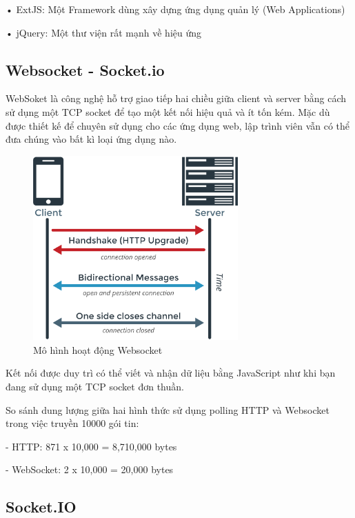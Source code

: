 • ExtJS: Một Framework dùng xây dựng ứng dụng quản lý (Web Applications)

• jQuery: Một thư viện rất mạnh về hiệu ứng

\subsection{Websocket - Socket.io}
WebSoket là công nghệ hỗ trợ giao tiếp hai chiều giữa client và server bằng cách sử dụng một TCP socket để tạo một kết nối hiệu quả và ít tốn kém. Mặc dù được thiết kế để chuyên sử dụng cho các ứng dụng web, lập trình viên vẫn có thể đưa chúng vào bất kì loại ứng dụng nào.\cite{c2wk}
\begin{figure}[H]
	\centering    
	\includegraphics[width=0.7\textwidth]{websk}
	\caption[Mô hình hoạt động Websocket]{Mô hình hoạt động Websocket\cite{c2wk2}} 
	\label{fig: websk}
\end{figure}

Kết nối được duy trì có thể viết và nhận dữ liệu bằng JavaScript như khi bạn đang sử dụng một TCP socket đơn thuần.

So sánh dung lượng giữa hai hình thức sử dụng polling HTTP và Websocket trong việc truyền 10000 gói tin:

- HTTP: 871 x 10,000 = 8,710,000 bytes

- WebSocket: 2 x 10,000 = 20,000 bytes



\subsection{Socket.IO}

